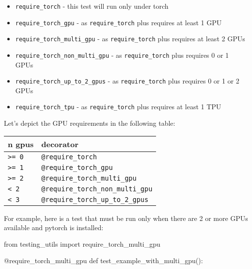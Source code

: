 \documentclass[
]{report}
\newenvironment{Shaded}{\begin{snugshade}}{\end{snugshade}}
\newcommand{\AttributeTok}[1]{\textcolor[rgb]{0.40,0.45,0.13}{#1}}
\newcommand{\ImportTok}[1]{\textcolor[rgb]{0.00,0.46,0.62}{#1}}
\newcommand{\KeywordTok}[1]{\textcolor[rgb]{0.00,0.23,0.31}{#1}}
\newcommand{\NormalTok}[1]{\textcolor[rgb]{0.00,0.23,0.31}{#1}}
\providecommand{\tightlist}{%
  \setlength{\itemsep}{0pt}\setlength{\parskip}{0pt}}\usepackage{longtable,booktabs,array}
\begin{document}
\begin{itemize}
\tightlist
\item
  \texttt{require\_torch} - this test will run only under torch
\item
  \texttt{require\_torch\_gpu} - as \texttt{require\_torch} plus
  requires at least 1 GPU
\item
  \texttt{require\_torch\_multi\_gpu} - as \texttt{require\_torch} plus
  requires at least 2 GPUs
\item
  \texttt{require\_torch\_non\_multi\_gpu} - as \texttt{require\_torch}
  plus requires 0 or 1 GPUs
\item
  \texttt{require\_torch\_up\_to\_2\_gpus} - as \texttt{require\_torch}
  plus requires 0 or 1 or 2 GPUs
\item
  \texttt{require\_torch\_tpu} - as \texttt{require\_torch} plus
  requires at least 1 TPU
\end{itemize}

Let's depict the GPU requirements in the following table:

\begin{longtable}[]{@{}ll@{}}
\toprule\noalign{}
n gpus & decorator \\
\midrule\noalign{}
\endhead
\bottomrule\noalign{}
\endlastfoot
\texttt{\textgreater{}=\ 0} & \texttt{@require\_torch} \\
\texttt{\textgreater{}=\ 1} & \texttt{@require\_torch\_gpu} \\
\texttt{\textgreater{}=\ 2} & \texttt{@require\_torch\_multi\_gpu} \\
\texttt{\textless{}\ 2} & \texttt{@require\_torch\_non\_multi\_gpu} \\
\texttt{\textless{}\ 3} & \texttt{@require\_torch\_up\_to\_2\_gpus} \\
\end{longtable}

For example, here is a test that must be run only when there are 2 or
more GPUs available and pytorch is installed:

\begin{Shaded}
\begin{Highlighting}[]
\ImportTok{from}\NormalTok{ testing\_utils }\ImportTok{import}\NormalTok{ require\_torch\_multi\_gpu}

\AttributeTok{@require\_torch\_multi\_gpu}
\KeywordTok{def}\NormalTok{ test\_example\_with\_multi\_gpu():}
\end{Highlighting}
\end{Shaded}
\end{document}
